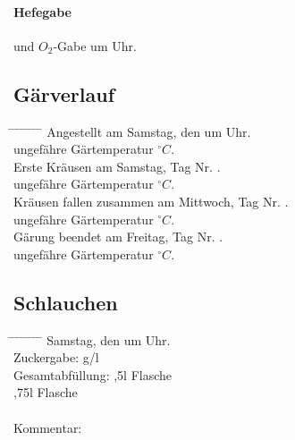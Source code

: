 \documentclass[12pt,oneside,a4paper]{scrartcl}
\begin{document}
{\paragraph{Hefegabe} und $O_2$-Gabe um  Uhr.
%
\subsection*{Gärverlauf}
	\begin{tabbing}
		\hspace{1cm} \= \hspace{1cm} \= \hspace{1cm} \= \hspace{1cm} \= \hspace{1cm} \= \hspace{1cm} \= \hspace{1cm} \= \hspace{1cm} \= \kill
		\> Angestellt am Samstag, den  um  Uhr.\\
		\> \> ungefähre Gärtemperatur  $^\circ C$.\\
		\> Erste Kräusen am Samstag,  Tag Nr. .\\
		\> \> ungefähre Gärtemperatur $^\circ C$.\\
		\> Kräusen fallen zusammen am Mittwoch, Tag Nr. .\\
		\> \> ungefähre Gärtemperatur $^\circ C$.\\
		\> Gärung beendet am Freitag, Tag Nr. .\\
		\> \> ungefähre Gärtemperatur $^\circ C$.
	\end{tabbing}
%
\subsection*{Schlauchen}
	\begin{tabbing}
		\hspace{1cm} \= \hspace{1cm} \= \hspace{1cm} \= \hspace{1cm} \= \hspace{1cm} \= \hspace{1cm} \= \hspace{1cm} \= \hspace{1cm} \= \kill
		\> Samstag, den  um  Uhr.\\
		\> Zuckergabe:  g/l\\
		\> Gesamtabfüllung: \> \> \> \>  ,5l Flasche\\
		\> \> \> \> \>  ,75l Flasche\\
		\\
		\> Kommentar: \>\>\>\\
	\end{tabbing}
%
}
\end{document}
